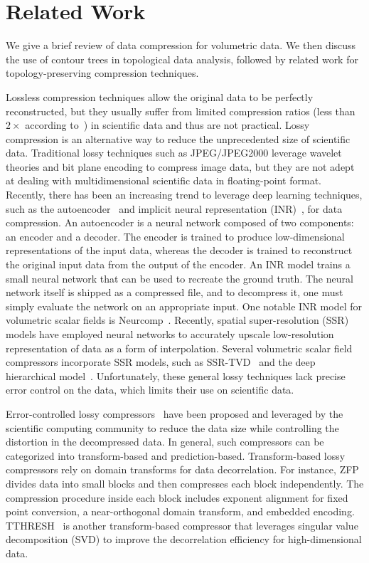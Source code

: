 \section{Related Work}
\label{sec:related-work}

We give a brief review of data compression for volumetric data. 
We then discuss the use of contour trees in topological data analysis, followed by related work for topology-preserving compression techniques.   

Lossless compression techniques allow the original data to be perfectly reconstructed, 
but they usually suffer from limited compression ratios (less than $2\times$ according to~\cite{son2014data}) in scientific data and thus are not practical. 
Lossy compression is an alternative way to reduce the unprecedented  size of scientific data. 
Traditional lossy techniques such as JPEG/JPEG2000 leverage wavelet theories and bit plane encoding to compress image data, but they are not adept at dealing with multidimensional scientific data in floating-point format. 
Recently, there has been an increasing trend to leverage deep learning techniques, such as the autoencoder~\cite{le2023hierarchical} and implicit neural representation (INR)~\cite{lu2021compressive}, for data compression.
An autoencoder is a neural network composed of two components: an encoder and a decoder. 
The encoder is trained to produce low-dimensional representations of the input data, whereas the decoder is trained to reconstruct the original input data from the output of the encoder. 
An INR model trains a small neural network that can be used to recreate the ground truth. 
The neural network itself is shipped as a compressed file, and to decompress it, one must simply evaluate the network on an appropriate input. 
One notable INR model for volumetric scalar fields is Neurcomp~\cite{lu2021compressive}.
Recently, spatial super-resolution (SSR) models have employed neural networks to accurately upscale low-resolution representation of data as a form of interpolation. 
Several volumetric scalar field compressors incorporate SSR models, such as SSR-TVD~\cite{han2020ssr} and the deep hierarchical model~\cite{wurster2022deep}.
Unfortunately, these general lossy techniques lack precise error control on the data, which limits their use on scientific data.


Error-controlled lossy compressors~\cite{lindstrom2014fixed,ballester2019tthresh,zhao2021optimizing,lakshminarasimhan2013isabela} have been proposed and leveraged by the scientific computing community to reduce the data size while controlling the distortion in the decompressed data. 
In general, such compressors can be categorized into transform-based and prediction-based. 
Transform-based lossy compressors rely on domain transforms for data decorrelation. 
For instance, ZFP~\cite{lindstrom2014fixed} divides data into small blocks and then compresses each block independently. The compression procedure inside each block includes exponent alignment for fixed point conversion, a near-orthogonal domain transform, and embedded encoding. 
TTHRESH~\cite{ballester2019tthresh} is another transform-based compressor that leverages singular value decomposition (SVD) to improve the decorrelation efficiency for high-dimensional data.


